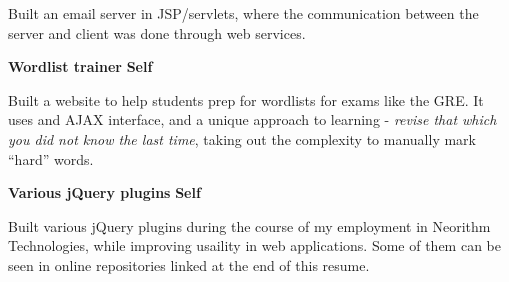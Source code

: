 \documentclass[a4paper,11pt,final]{article}
\newcommand{\projexp}[2]{%
  \vspace{12pt}
  \noindent\textbf{{#1}}
  \hfill
  \textbf{{#2}}
  \\\vspace{-12pt}
}
\begin{document}
\noindent Built an email server in JSP/servlets, where the
communication between the server and client was done through web
services.

\projexp{Wordlist trainer}{Self}

\noindent Built a website to help students prep for wordlists for
exams like the GRE. It uses and AJAX interface, and a unique approach
to learning - \textit{revise that which you did not know the last
  time}, taking out the complexity to manually mark ``hard'' words.

\projexp{Various jQuery plugins}{Self}

\noindent Built various jQuery plugins during the course of my
employment in Neorithm Technologies, while improving usaility in web
applications. Some of them can be seen in online repositories linked
at the end of this resume.
\end{document}
